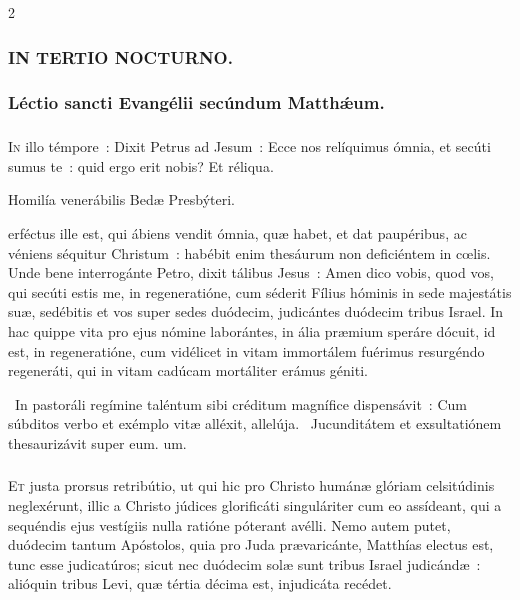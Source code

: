 \documentclass[9pt,twoside]{extarticle}
\begin{document}
\begin{multicols}{2}
\subsubsection*{\center \textsc{IN TERTIO NOCTURNO.}}
\subsubsection*{\center Léctio sancti Evangélii secúndum Matthǽum.}
\subsubsection*{\center {}}
\lettrine{I}n illo témpore~: Dixit Petrus ad Jesum~: Ecce nos relíquimus ómnia, et secúti sumus te~: quid ergo erit nobis? Et réliqua.

\begin{center}Homilía venerábilis Bedæ Presbýteri.\\
\end{center}
erféctus ille est, qui ábiens vendit ómnia, quæ habet, et dat paupéribus, ac véniens séquitur Christum~: habébit enim thesáurum non deficiéntem in cœlis. Unde bene interrogánte Petro, dixit tálibus Jesus~: Amen dico vobis, quod vos, qui secúti estis me, in regeneratióne, cum séderit Fílius hóminis in sede majestátis suæ, sedébitis et vos super sedes duódecim, judicántes duódecim tribus Israel. In hac quippe vita pro ejus nómine laborántes, in ália præmium speráre dócuit, id est, in regeneratióne, cum vidélicet in vitam immortálem fuérimus resurgéndo regeneráti, qui in vitam cadúcam mortáliter erámus géniti.

\begin{tightlist}{}
\item {}~In pastoráli regímine taléntum sibi créditum magnífice dispensávit~: \textred{*} Cum súbditos verbo et exémplo vitæ alléxit, allelúja. ~Jucunditátem et exsultatiónem thesaurizávit super eum. um.
\end{tightlist}

\subsubsection*{\center {}}
\lettrine{E}t justa prorsus retribútio, ut qui hic pro Christo humánæ glóriam celsitúdinis neglexérunt, illic a Christo júdices glorificáti singuláriter cum eo assídeant, qui a sequéndis ejus vestígiis nulla ratióne póterant avélli. Nemo autem putet, duódecim tantum Apóstolos, quia pro Juda prævaricánte, Matthías electus est, tunc esse judicatúros; sicut nec duódecim solæ sunt tribus Israel judicándæ~: alióquin tribus Levi, quæ tértia décima est, injudicáta recédet.


\end{multicols}
\end{document}
